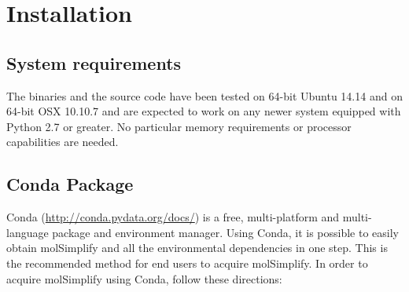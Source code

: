 
\section{Installation}
\subsection{System requirements}
The binaries and the source code have been tested on 64-bit Ubuntu 14.14 and on 64-bit OSX 10.10.7 and are expected to work on any newer system equipped with Python 2.7 or greater. No particular memory requirements or processor capabilities are needed. 

\subsection{Conda Package}
Conda (\url{http://conda.pydata.org/docs/}) is a free, multi-platform and multi-language package and environment manager. Using Conda, it is possible to easily obtain molSimplify and all the environmental dependencies in one step. This is the recommended method for end users to acquire molSimplify. In order to acquire molSimplify using Conda, follow these directions:

